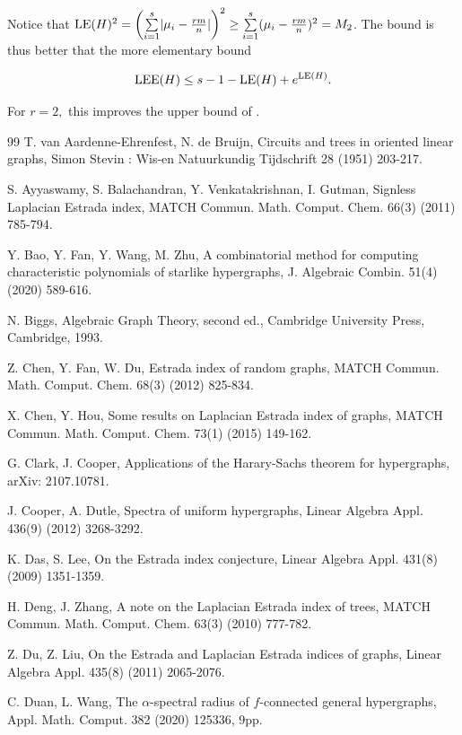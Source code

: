 \documentclass[11pt]{article}
\def\LEE{\mathop{\rm LEE }\nolimits}
\def\LE{\mathop{\rm LE }\nolimits}
\begin{document}
Notice that $\LE(H)^{2}=\left(\sum\limits_{i=1}^{s}\lvert\mu_{i}-\tfrac{rm}{n}\rvert\right)^{2}\geq \sum\limits_{i=1}^{s}(\mu_{i}-\tfrac{rm}{n})^{2}=M_{2}$.
The bound is thus better that the more elementary bound

$$\LEE(H) \leq s-1-\LE(H)+e^{\LE(H)}.$$

For $r=2,$  this improves the upper bound of \cite[Eq.~18]{LSC}.

\begin{thebibliography}{99}
 T. van Aardenne-Ehrenfest, N. de Bruijn, Circuits and trees in oriented linear graphs, Simon Stevin : Wis-en Natuurkundig Tijdschrift 28 (1951) 203-217.

 S. Ayyaswamy, S. Balachandran, Y. Venkatakrishnan, I. Gutman, Signless Laplacian Estrada index, MATCH Commun. Math. Comput. Chem. 66(3) (2011) 785-794.

 Y. Bao, Y. Fan, Y. Wang, M. Zhu, A combinatorial method for computing characteristic polynomials of starlike hypergraphs, J. Algebraic Combin. 51(4) (2020) 589-616.

 N. Biggs, Algebraic Graph Theory, second ed., Cambridge University Press, Cambridge, 1993.

 Z. Chen, Y. Fan, W. Du, Estrada index of random graphs, MATCH Commun. Math. Comput. Chem. 68(3) (2012) 825-834.

 X. Chen, Y. Hou, Some results on Laplacian Estrada index of graphs, MATCH Commun. Math. Comput. Chem. 73(1) (2015) 149-162.

 G. Clark, J. Cooper, Applications of the Harary-Sachs theorem for hypergraphs, arXiv: 2107.10781.

 J. Cooper, A. Dutle, Spectra of uniform hypergraphs, Linear Algebra Appl. 436(9) (2012) 3268-3292.

 K. Das, S. Lee, On the Estrada index conjecture,  Linear Algebra Appl. 431(8) (2009) 1351-1359.

 H. Deng, J. Zhang, A note on the Laplacian Estrada index of trees, MATCH Commun. Math. Comput. Chem. 63(3) (2010) 777-782.

 Z. Du, Z. Liu, On the Estrada and Laplacian Estrada indices of graphs, Linear Algebra Appl. 435(8) (2011) 2065-2076.

 C. Duan, L. Wang, The $\alpha$-spectral radius of $f$-connected general hypergraphs, Appl. Math. Comput. 382 (2020) 125336, 9pp.


\end{thebibliography}
\end{document}
